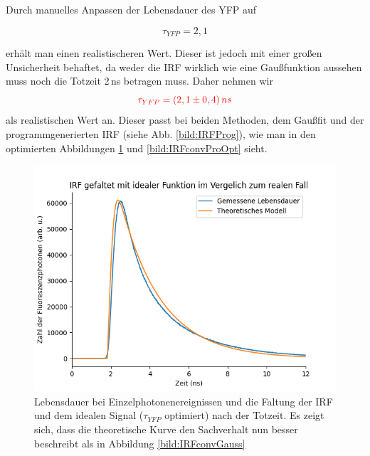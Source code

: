 Durch manuelles Anpassen der Lebensdauer des YFP auf 

\begin{equation*}
    \tau_{YFP} = 2,1
\end{equation*}

erhält man einen realistischeren Wert. Dieser ist jedoch mit einer großen Unsicherheit behaftet, da weder die IRF wirklich wie eine 
Gaußfunktion aussehen muss noch die Totzeit 2\,ns betragen muss. Daher nehmen wir 
\begin{equation*}
    \textcolor{red}{\tau_{YFP} = (2,1\pm0,4)\,ns}
\end{equation*}
als realistischen Wert an. Dieser passt bei beiden Methoden, dem Gaußfit und der programmgenerierten IRF (siehe Abb. \ref{bild:IRFProg}), wie man in den optimierten Abbildungen \ref{bild:IRFconvGaussOpt} und \ref{bild:IRFconvProOpt} sieht.

\begin{figure}[h]
    \centering
    \includegraphics[width = \linewidth]{Bilder/Auswertung/IRFGaussianConvolCorrectet.png}
    \caption{Lebensdauer bei Einzelphotonenereignissen und die Faltung der IRF und dem idealen Signal ($\tau_{YFP}$ optimiert) nach der Totzeit. Es zeigt sich, dass die theoretische Kurve 
    den Sachverhalt nun besser beschreibt als in Abbildung \ref{bild:IRFconvGauss}}
    \label{bild:IRFconvGaussOpt}
\end{figure}

